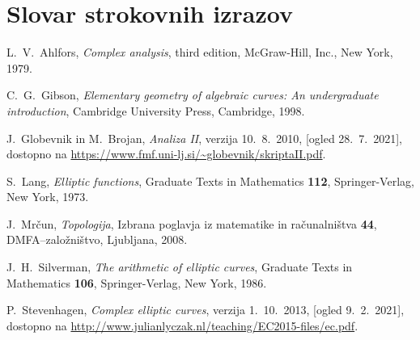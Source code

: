 \documentclass[mat1]{fmfdelo}
\numberwithin{equation}{section}
\theoremstyle{definition}
\begin{document}

\break

\section*{Slovar strokovnih izrazov}

\geslo{}{}
\geslo{}{}


\begin{thebibliography}{99}
    
        L.~V.~Ahlfors, \emph{Complex analysis}, third edition, McGraw-Hill, Inc., New York, 1979.

        C.~G.~Gibson, \emph{Elementary geometry of algebraic curves: An undergraduate introduction}, Cambridge University Press, Cambridge, 1998.

        J.~Globevnik in M.~Brojan, \emph{Analiza II}, verzija 10.~8.~2010, [ogled 28.~7.~2021], dostopno na \url{https://www.fmf.uni-lj.si/~globevnik/skriptaII.pdf}.
    
        S.~Lang, \emph{Elliptic functions}, Graduate Texts in Mathematics \textbf{112}, Springer-Verlag, New York, 1973.

        J.~Mrčun, \emph{Topologija}, Izbrana poglavja iz matematike in računalništva \textbf{44}, DMFA--založništvo, Ljubljana, 2008.
    
        J.~H.~Silverman, \emph{The arithmetic of elliptic curves}, Graduate Texts in Mathematics \textbf{106}, Springer-Verlag, New York, 1986.

        P.~Stevenhagen, \emph{Complex elliptic curves}, verzija 1.~10.~2013, [ogled 9.~2.~2021], dostopno na \url{http://www.julianlyczak.nl/teaching/EC2015-files/ec.pdf}.
    
\end{thebibliography}
\end{document}
